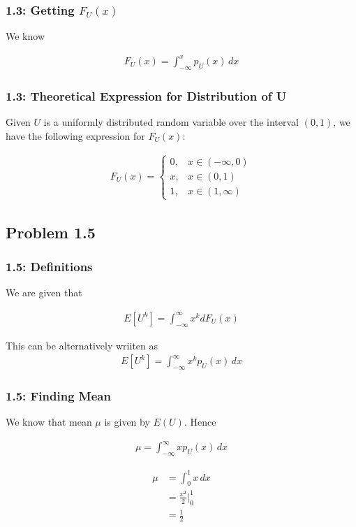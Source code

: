 \documentclass{beamer}
\begin{document}
\begin{frame}
	\frametitle{1.3: Getting $F_U(x)$}

	We know

	\begin{align}
		F_U(x) = \int_{-\infty}^{x} p_U(x) \,dx
		\label{eq:Relation}
	\end{align}

\end{frame}

\begin{frame}
	\frametitle{1.3: Theoretical Expression for Distribution of U}
	Given $U$ is a uniformly distributed random variable over the interval $(0, 1)$, we have the following expression for $F_U(x)$:
	
	\begin{align}
		F_U(x) = 
		\begin{cases}
			0, & x \in (-\infty, 0) \\
      			x, & x \in (0, 1) \\
      			1, & x \in (1, \infty)
    		\end{cases}
	\end{align}
\end{frame}

\subsection{Problem 1.5}
\begin{frame}
	\frametitle{1.5: Definitions}

	We are given that

	\begin{align}
		E[U^k] = \int^{\infty}_{-\infty} x^k dF_U(x)
	\end{align}

	This can be alternatively wriiten as
	\begin{align}
		E[U^k] = \int^{\infty}_{-\infty} x^k p_U(x) \,dx
		\label{eq: Expected}
	\end{align}

\end{frame}

\begin{frame}
	\frametitle{1.5: Finding Mean}
	We know that mean $\mu$ is given by $E(U)$. Hence

	\begin{align}
		\mu = \int_{-\infty}^{\infty} x p_U(x) \,dx
		\label{eq:Relation_1}
	\end{align}

	\begin{align}
		\mu &= \int_{0}^{1} x \,dx \\
		&= \frac{x^2}{2} \big|^{1}_{0} \\
		&= \frac{1}{2} 
		\label{eq: Mean}
	\end{align}

\end{frame}
\end{document}
